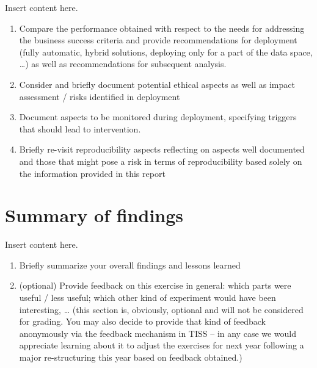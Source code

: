 \documentclass[sigchi]{acmart}
\def\tightlist{}
\begin{document}
Insert content here.

\begin{enumerate}
\def\labelenumi{\alph{enumi}.}
\tightlist
\item
  Compare the performance obtained with respect to the needs for addressing the business success criteria and provide recommendations for deployment (fully automatic, hybrid solutions, deploying only for a part of the data space, \ldots) as well as recommendations for subsequent analysis.
\item
  Consider and briefly document potential ethical aspects as well as impact assessment / risks identified in deployment
\item
  Document aspects to be monitored during deployment, specifying triggers that should lead to intervention.
\item
  Briefly re-visit reproducibility aspects reflecting on aspects well documented and those that might pose a risk in terms of reproducibility based solely on the information provided in this report
\end{enumerate}

\hypertarget{summary-of-findings}{%
\section{Summary of findings}\label{summary-of-findings}}

Insert content here.

\begin{enumerate}
\def\labelenumi{\alph{enumi}.}
\tightlist
\item
  Briefly summarize your overall findings and lessons learned
\item
  (optional) Provide feedback on this exercise in general: which parts were useful / less useful; which other kind of experiment would have been interesting, \ldots{} (this section is, obviously, optional and will not be considered for grading. You may also decide to provide that kind of feedback anonymously via the feedback mechanism in TISS -- in any case we would appreciate learning about it to adjust the exercises for next year following a major re-structuring this year based on feedback obtained.)
\end{enumerate}



\end{document}
